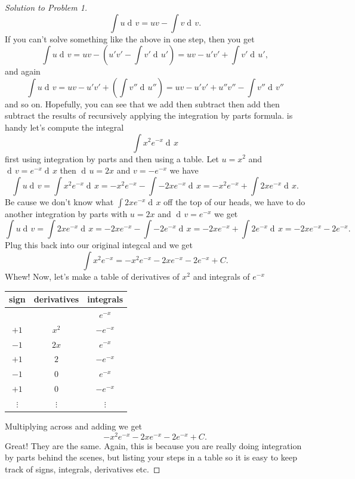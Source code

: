 \documentclass[12pt]{article}
\theoremstyle{plain}
\theoremstyle{definition}
\theoremstyle{remark}
\DeclareMathOperator{\diff}{d\!}
\begin{document}
\begin{proof}[Solution to Problem 1]
{\[
\int u\diff v=uv-\int v\diff v.
\]
If you can't solve something like the above in one step, then you get
\[
\int u\diff v=uv-\left(u' v'-\int v'\diff u'\right)=uv-u'v'+\int v'\diff u',
\]
and again
\[
\int u\diff v=uv-u'v'+\left(\int v''\diff u''\right)=uv-u'v'+u''v''-\int v''\diff v''
\]
and so on. Hopefully, you can see that we add then subtract then add then
subtract the results of recursively applying the integration by parts formula.
} is handy let's compute the integral
\[
\int x^2e^{-x}\diff x
\]
first using integration by parts and then using a table. Let $u=x^2$ and
$\diff v=e^{-x}\diff x$ then $\diff u=2x$ and $v=-e^{-x}$
we have
\[
\int u\diff v=\int x^2e^{-x}\diff x=-x^2e^{-x}-\int -2xe^{-x}\diff x
=-x^2e^{-x}+\int 2xe^{-x}\diff x.
\]
Be cause we don't know what $\int 2xe^{-x}\diff x$  off the top of our
heads, we have to do another integration by parts with $u=2x$ and $\diff
v=e^{-x}$ we get
\[
\int u\diff v=\int 2xe^{-x}\diff x=-2xe^{-x}-\int -2e^{-x}\diff
x=-2xe^{-x}+\int 2e^{-x}\diff x=-2xe^{-x}-2e^{-x}.
\]
Plug this back into our original integcal and we get
\[
\int x^2e^{-x}=-x^2e^{-x}-2xe^{-x}-2e^{-x}+C.
\]
Whew! Now, let's make a table of derivatives of $x^2$ and integrals of
$e^{-x}$
\begin{center}
\begin{tabular}{|c|c|c|}
\hline
sign&derivatives&integrals\\
\hline
~&~&$e^{-x}$\\
$+1$&$x^2$&$-e^{-x}$\\
$-1$&$2x$&$e^{-x}$\\
$+1$&$2$&$-e^{-x}$\\
$-1$&$0$&$e^{-x}$\\
$+1$&$0$&$-e^{-x}$\\
$\vdots$&$\vdots$&$\vdots$\\
\hline
\end{tabular}
\end{center}
Multiplying across and adding we get
\[
-x^2e^{-x}-2xe^{-x}-2e^{-x}+C.
\]
Great! They are the same. Again, this is because you are really doing
integration by parts behind the scenes, but listing your steps in a table
so it is easy to keep track of signs, integrals, derivatives etc.
\end{proof}
\end{document}
